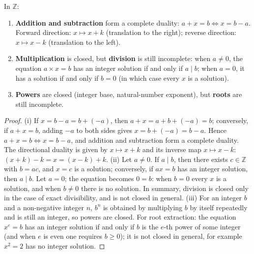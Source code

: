 \begin{proposition}\label{prop:integer_operation_duality}
In $\mathbb{Z}$:
\begin{enumerate}[label=(\roman*)]
    \item \textbf{Addition and subtraction} form a complete duality: $a + x = b \iff x = b - a$. Forward direction: $x \mapsto x + k$ (translation to the right); reverse direction: $x \mapsto x - k$ (translation to the left).
    \item \textbf{Multiplication} is closed, but \textbf{division} is still incomplete: when $a \neq 0$, the equation $a \times x = b$ has an integer solution if and only if $a \mid b$; when $a = 0$, it has a solution if and only if $b = 0$ (in which case every $x$ is a solution).
    \item \textbf{Powers} are closed (integer base, natural-number exponent), but \textbf{roots} are still incomplete.
\end{enumerate}
\end{proposition}

\begin{proof}
(i) If $x = b - a = b + (-a)$, then $a + x = a + b + (-a) = b$; conversely, if $a + x = b$, adding $-a$ to both sides gives $x = b + (-a) = b - a$. Hence $a + x = b \iff x = b - a$, and addition and subtraction form a complete duality. The directional duality is given by $x \mapsto x + k$ and its inverse map $x \mapsto x - k$: $(x+k)-k = x = (x-k)+k$.
(ii) Let $a \neq 0$. If $a \mid b$, then there exists $c \in \mathbb{Z}$ with $b = ac$, and $x = c$ is a solution; conversely, if $ax = b$ has an integer solution, then $a \mid b$. Let $a = 0$; the equation becomes $0 = b$: when $b = 0$ every $x$ is a solution, and when $b \neq 0$ there is no solution. In summary, division is closed only in the case of exact divisibility, and is not closed in general.
(iii) For an integer $b$ and a non-negative integer $n$, $b^n$ is obtained by multiplying $b$ by itself repeatedly and is still an integer, so powers are closed. For root extraction: the equation $x^e = b$ has an integer solution if and only if $b$ is the $e$-th power of some integer (and when $e$ is even one requires $b \geq 0$); it is not closed in general, for example $x^2 = 2$ has no integer solution.
\end{proof}

